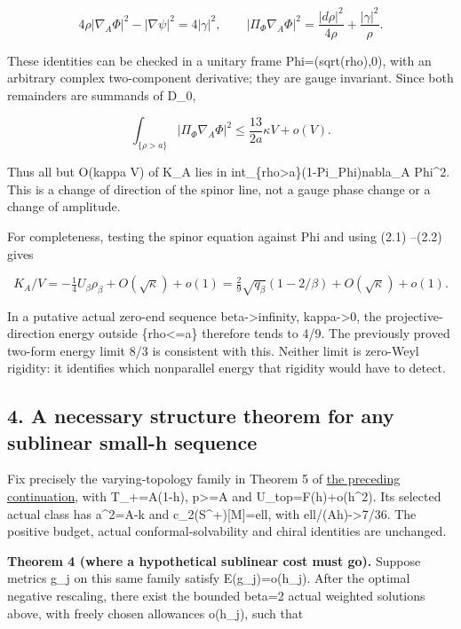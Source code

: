 \documentclass[
  10pt,
]{article}
\begin{document}
\[
 4\rho|\nabla_A\Phi|^2-|\nabla\psi|^2=4|\gamma|^2,
 \qquad
 |\Pi_\Phi\nabla_A\Phi|^2
       =\frac{|d\rho|^2}{4\rho}+\frac{|\gamma|^2}{\rho}.
                                                        \tag{3.3}
\]

These identities can be checked in a unitary frame Phi=(sqrt(rho),0),
with an arbitrary complex two-component derivative; they are gauge
invariant. Since both remainders are summands of D\_0,

\[
 \int_{\{\rho>a\}}|\Pi_\Phi\nabla_A\Phi|^2
       \le\frac{13}{2a}\kappa V+o(V).                 \tag{3.4}
\]

Thus all but O(kappa V) of K\_A lies in
int\_\{rho\textgreater a\}\textbar(1-Pi\_Phi)nabla\_A Phi\textbar\^{}2.
This is a change of direction of the spinor line, not a gauge phase
change or a change of amplitude.

For completeness, testing the spinor equation against Phi and using
(2.1) --(2.2) gives

\[
 K_A/V=-\tfrac14 U_\beta\rho_\beta+O(\sqrt\kappa)+o(1)
       =\tfrac29\sqrt{q_\beta}(1-2/\beta)
          +O(\sqrt\kappa)+o(1).                       \tag{3.5}
\]

In a putative actual zero-end sequence beta-\textgreater infinity,
kappa-\textgreater0, the projective-direction energy outside
\{rho\textless=a\} therefore tends to 4/9. The previously proved
two-form energy limit 8/3 is consistent with this. Neither limit is
zero-Weyl rigidity: it identifies which nonparallel energy that rigidity
would have to detect.

\hypertarget{a-necessary-structure-theorem-for-any-sublinear-small-h-sequence}{%
\subsection{4. A necessary structure theorem for any sublinear small-h
sequence}\label{a-necessary-structure-theorem-for-any-sublinear-small-h-sequence}}

Fix precisely the varying-topology family in Theorem 5 of
\href{20260926_boundary_compatibility.md}{the preceding continuation},
with T\_+=A(1-h), p\textgreater=A and U\_top=F(h)+o(h\^{}2). Its
selected actual class has a\^{}2=A-k and c\_2(S\^{}+){[}M{]}=ell, with
ell/(Ah)-\textgreater7/36. The positive budget, actual
conformal-solvability and chiral identities are unchanged.

\textbf{Theorem 4 (where a hypothetical sublinear cost must go).}
Suppose metrics g\_j on this same family satisfy E(g\_j)=o(h\_j). After
the optimal negative rescaling, there exist the bounded beta=2 actual
weighted solutions above, with freely chosen allowances o(h\_j), such
that
\end{document}
